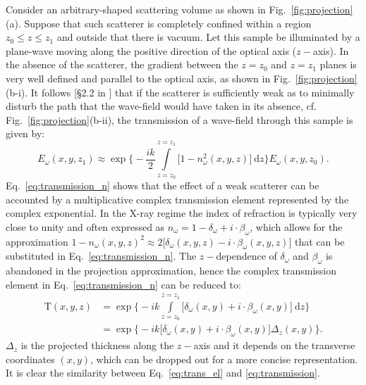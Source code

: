\documentclass{iucr}              %
\begin{document}
Consider an arbitrary-shaped scattering volume as shown in Fig.~\ref{fig:projection}(a). Suppose that such scatterer is completely confined within a region $z_0\leq z\leq z_1$ and outside that there is vacuum. Let this sample be illuminated by a plane-wave moving along the positive direction of the optical axis ($z-$axis). In the absence of the scatterer, the gradient between the $z=z_0$ and $z=z_1$ planes is very well defined and parallel to the optical axis, as shown in Fig.~\ref{fig:projection}(b-$\mathrm{i}$). It follows [§2.2 in  \cite{paganin_book}] that if the scatterer is sufficiently weak as to minimally disturb the path that the wave-field would have taken in its absence, cf. Fig.~\ref{fig:projection}(b-$\mathrm{ii}$), the transmission of a wave-field through this sample is given by:
\begin{equation}\label{eq:transmission_n}
    E_\omega(x,y,z_1)\approx\exp\Bigg\{-\frac{ik}{2}\int\limits_{z=z_0}^{z=z_1}{\big[1-n_\omega^2(x,y,z)\big]~\mathrm{d}z}\Bigg\}E_\omega(x,y,z_0).
\end{equation}{}
Eq.~\ref{eq:transmission_n} shows that the effect of a weak scatterer can be accounted by a multiplicative complex transmission element represented by the complex exponential. In the X-ray regime the index of refraction is typically very close to unity and often expressed as $n_\omega=1-\delta_\omega+i\cdot\beta_\omega$, which allows for the approximation $1-n_\omega(x,y,z)^2\approx2\big[\delta_\omega(x,y,z)-i\cdot\beta_\omega(x,y,z)\big]$ that can be substituted in Eq.~\ref{eq:transmission_n}. The $z-$dependence of $\delta_\omega$ and $\beta_\omega$ is abandoned in the projection approximation, hence the complex transmission element in Eq.~\ref{eq:transmission_n} can be reduced to:
\begin{align}\label{eq:transmission}
\mathrm{T}(x,y,z) &=\exp\Bigg\{-ik\int\limits_{z=z_0}^{z=z_1}{\big[\delta_\omega(x,y)+i\cdot\beta_\omega(x,y)\big]~\mathrm{d}z}\Bigg\}\nonumber\\
         &=\exp\Bigg\{-ik\big[\delta_\omega(x,y)+i\cdot\beta_\omega(x,y)\big]\Delta_z(x,y)\Bigg\}.
\end{align}{}
$\Delta_z$ is the projected thickness along the $z-$axis and it depends on the transverse coordinates $(x,y)$, which can be dropped out for a more concise representation. It is clear the similarity between Eq.~\ref{eq:trans_el} and \ref{eq:transmission}.
\end{document}
